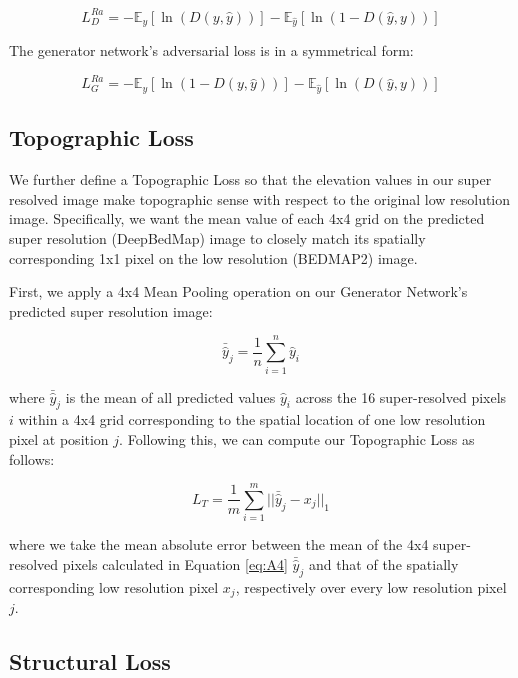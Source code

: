 \documentclass[tc, manuscript]{copernicus}
\begin{document}
\begin{equation}\label{eq:A2}
  L_D^{Ra} = - \mathbb{E}_y[\ln(D(y,\hat{y}))] - \mathbb{E}_{\hat{y}}[\ln(1 - D(\hat{y},y))]
\end{equation}

The generator network's adversarial loss is in a symmetrical form:

\begin{equation}\label{eq:A3}
  L_G^{Ra} = - \mathbb{E}_y[\ln(1 - D(y,\hat{y}))] - \mathbb{E}_{\hat{y}}[\ln(D(\hat{y},y))]
\end{equation}

\subsection{Topographic Loss}

We further define a Topographic Loss so that the elevation values in our super resolved image make topographic sense with respect to the original low resolution image.
Specifically, we want the mean value of each 4x4 grid on the predicted super resolution (DeepBedMap) image to closely match its spatially corresponding 1x1 pixel on the low resolution (BEDMAP2) image.

First, we apply a 4x4 Mean Pooling operation on our Generator Network's predicted super resolution image:

\begin{equation}\label{eq:A4}
 \bar{\hat{y}}_j = \dfrac{1}{n} \sum\limits_{i=1}^n \hat{y}_i
\end{equation}

where $\bar{\hat{y}}_j$ is the mean of all predicted values $\hat{y}_i$ across the 16 super-resolved pixels $i$ within a 4x4 grid corresponding to the spatial location of one low resolution pixel at position $j$.
Following this, we can compute our Topographic Loss as follows:

\begin{equation}\label{eq:A5}
  L_T = \dfrac{1}{m} \sum\limits_{i=1}^m ||\bar{\hat{y}}_j - x_j||_{1}
\end{equation}

where we take the mean absolute error between the mean of the 4x4 super-resolved pixels calculated in Equation \eqref{eq:A4} $\bar{\hat{y}}_j$ and that of the spatially corresponding low resolution pixel $x_j$, respectively over every low resolution pixel $j$.

\subsection{Structural Loss}
\end{document}
